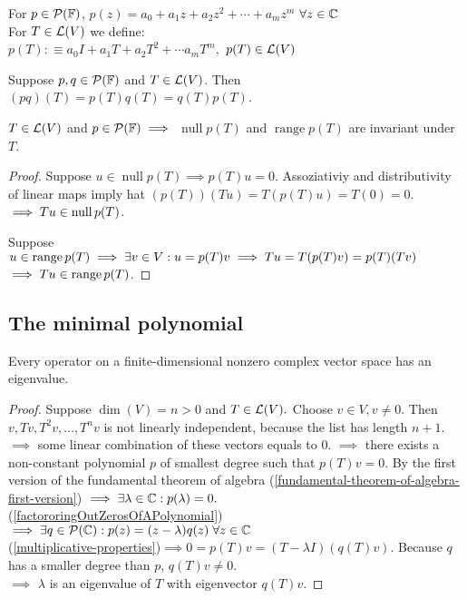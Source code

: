 \begin{mydef}
    For $p \in \mathcal{P} (\mathbb{F})$, $p(z) = a_0+a_1z+a_2z^2+\cdots+a_mz^m$ 
    $\forall z \in \mathbb{C}$\\
    For $T \in \mathcal{L} (V)$ we define: \\
    $p(T) :\equiv a_0 I + a_1 T + a_2 T^2 + \cdots a_m T^m,$ $p(T) \in \mathcal{L}(V)$
\end{mydef}



\setcounter{thm}{16}
\begin{thm}
    \label{multiplicative-properties}
    Suppose $p,q \in \mathcal{P} (\mathbb{F})$ and $T\in \mathcal{L} (V)$. Then $(p q)(T) = p(T) q(T) = q(T)p(T)$.
\end{thm}

\begin{thm}
    \label{null-space-and-range-of-p(T)-are-invariant-under-T}
    $T \in \mathcal{L}(V)$ and $p\in \mathcal{P} (\mathbb{F}) \implies$
    $\operatorname{null} p(T)$ and $\operatorname{range} p(T)$ are invariant under $T$.
\end{thm}
\begin{proof}
    Suppose $u\in \operatorname{null} p(T) \implies p(T)u = 0$. Assoziativiy and distributivity of linear maps imply hat $(p(T))(Tu)=T(p(T)u)=T(0)=0$.$\implies Tu \in \operatorname{null} p(T)$.
    
    Suppose $u \in \operatorname{range} p(T) \implies \exists v\in V: u=p(T)v \implies Tu=T(p(T)v)=p(T)(Tv)$ \\ 
    $\implies Tu \in \operatorname{range} p(T)$.
\end{proof}

\subsection{The minimal polynomial}

\begin{thm}
    Every operator on a finite-dimensional nonzero complex vector space has an eigenvalue.
\end{thm}
\begin{proof}
    Suppose $\dim(V)=n>0$ and $T\in \mathcal{L}(V).$ Choose $v\in V, v\neq0$. Then $v, Tv, T^2v, \dots, T^nv$ is not linearly independent, because the list has length $n+1$. $\implies$ some linear combination of these vectors equals to $0$. $\implies$ there exists a non-constant polynomial $p$ of smallest degree such that $p(T)v = 0$. By the first version of the fundamental theorem of algebra (\ref{fundamental-theorem-of-algebra-first-version}) $\implies \exists \lambda \in \mathbb{C}: p(\lambda) = 0.$\\
    (\ref{factororingOutZerosOfAPolynomial})$\implies \exists q \in \mathcal {P} (\mathbb{C}): p(z) = (z-\lambda)  q(z) \; \forall z \in \mathbb{C}$ \\
    (\ref{multiplicative-properties})$\implies 0=p(T)v=(T-\lambda I) (q(T)v)$. Because $q$ has a smaller degree than $p$, $q(T)v \neq 0$. \\
    $\implies$ $\lambda$ is an eigenvalue of $T$ with eigenvector $q(T)v$. 
\end{proof}

